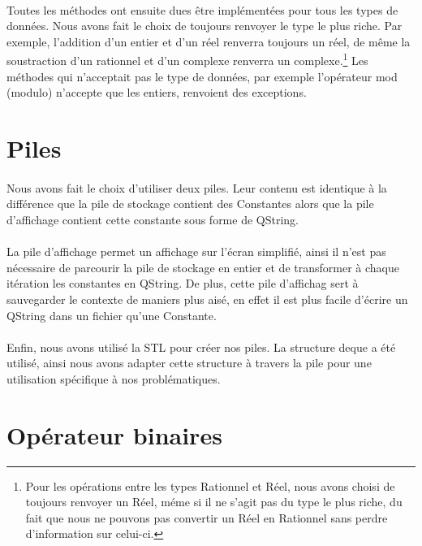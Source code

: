 \documentclass[a4paper,12pt]{report}
\begin{document}
		\paragraph{}Toutes les méthodes ont ensuite dues être implémentées pour tous les types de données. Nous avons fait le choix de toujours renvoyer le type le plus riche. Par exemple, l'addition d'un entier et d'un réel renverra toujours un réel, de même la soustraction d'un rationnel et d'un complexe renverra un complexe.\footnote{Pour les opérations entre les types Rationnel et Réel, nous avons choisi de toujours renvoyer un Réel, méme si il ne s'agit pas du type le plus riche, du fait que nous ne pouvons pas convertir un Réel en Rationnel sans perdre d'information sur celui-ci.} Les méthodes qui n'acceptait pas le type de données, par exemple l'opérateur mod (modulo) n'accepte que les entiers, renvoient des exceptions.

	\section{Piles}
		\paragraph{}Nous avons fait le choix d'utiliser deux piles. Leur contenu est identique à la différence que la pile de stockage contient des Constantes alors que la pile d’affichage contient cette constante sous forme de QString.
		
		\paragraph{}La pile d’affichage permet un affichage sur l’écran simplifié, ainsi il n'est pas nécessaire de parcourir la pile de stockage en entier et de transformer à chaque itération les constantes en QString. De plus, cette pile d'affichag sert à sauvegarder le contexte de maniers plus aisé, en effet il est plus facile d'écrire un QString dans un fichier qu'une Constante.
		
		\paragraph{}Enfin, nous avons utilisé la STL pour créer nos piles. La structure deque a été utilisé, ainsi nous avons adapter cette structure à travers la pile pour une utilisation spécifique à nos problématiques.
		
	\section{Opérateur binaires}
\end{document}
